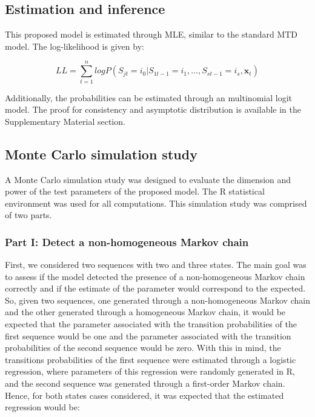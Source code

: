 \subsection{Estimation and inference}\label{estimation-and-inference}

This proposed model is estimated through MLE, similar to the standard MTD model. The log-likelihood is given by:

\begin{equation}
LL = \sum_{t = 1}^n log P(S_{jt} =  i_0 | S_{1t-1} = i_1, \dots, S_{st-1} = i_s, \boldsymbol{x}_t) \label{eq:eq10}
\end{equation}

Additionally, the probabilities can be estimated through an multinomial logit model. The proof for consistency and asymptotic distribution is available in the Supplementary Material section.

\subsection{Monte Carlo simulation study}\label{monte-carlo-simulation-study}

A Monte Carlo simulation study was designed to evaluate the dimension and power of the test parameters of the proposed model. The R statistical environment was used for all computations. This simulation study was comprised of two parts.

\subsubsection{Part I: Detect a non-homogeneous Markov chain}\label{part-i-detect-a-non-homogeneous-markov-chain}

First, we considered two sequences with two and three states. The main goal was to assess if the model detected the presence of a non-homogeneous Markov chain correctly and if the estimate of the parameter would correspond to the expected. So, given two sequences, one generated through a non-homogeneous Markov chain and the other generated through a homogeneous Markov chain, it would be expected that the parameter associated with the transition probabilities of the first sequence would be one and the parameter associated with the transition probabilities of the second sequence would be zero. With this in mind, the transitions probabilities of the first sequence were estimated through a logistic regression, where parameters of this regression were randomly generated in R, and the second sequence was generated through a first-order Markov chain. Hence, for both states cases considered, it was expected that the estimated regression would be:

